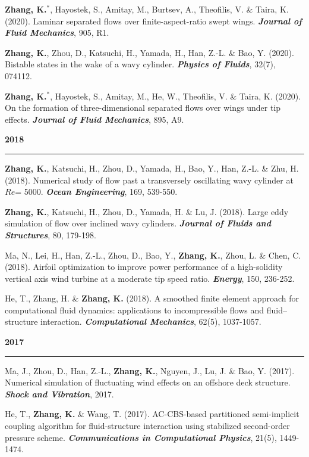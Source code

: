 \documentclass[10pt]{article}
\begin{document}
{\begin{etaremune}
  \item \textbf{Zhang, K.}$^*$, Hayostek, S., Amitay, M., Burtsev, A., Theofilis, V. \& Taira, K. (2020). Laminar separated flows over finite-aspect-ratio swept wings. \textit{\textbf{Journal of Fluid Mechanics}}, 905, R1.
  
  \item \textbf{Zhang, K.}, Zhou, D., Katsuchi, H., Yamada, H., Han, Z.-L. \& Bao, Y. (2020). Bistable states in the wake of a wavy cylinder. \textit{\textbf{Physics of Fluids}}, 32(7), 074112.
  
  \item \textbf{Zhang, K.}$^*$, Hayostek, S., Amitay, M., He, W., Theofilis, V. \& Taira, K. (2020). On the formation of three-dimensional separated flows over wings under tip effects. \textit{\textbf{Journal of Fluid Mechanics}}, 895, A9.

 \item [] {\bf \color{Blue} 2018 \rule{14.8cm}{0.2mm}} 

  \item \textbf{Zhang, K.}, Katsuchi, H., Zhou, D., Yamada, H., Bao, Y., Han, Z.-L. \& Zhu, H. (2018). Numerical study of flow past a transversely oscillating wavy cylinder at $Re$= 5000. \textit{\textbf{Ocean Engineering}}, 169, 539-550.
  
  \item \textbf{Zhang, K.}, Katsuchi, H., Zhou, D., Yamada, H. \& Lu, J. (2018). Large eddy simulation of flow over inclined wavy cylinders. \textit{\textbf{Journal of Fluids and Structures}}, 80, 179-198.
  
  \item Ma, N., Lei, H., Han, Z.-L., Zhou, D., Bao, Y., \textbf{Zhang, K.}, Zhou, L. \& Chen, C. (2018). Airfoil optimization to improve power performance of a high-solidity vertical axis wind turbine at a moderate tip speed ratio. \textit{\textbf{Energy}}, 150, 236-252.
  
  \item He, T., Zhang, H. \& \textbf{Zhang, K.} (2018). A smoothed finite element approach for computational fluid dynamics: applications to incompressible flows and fluid–structure interaction. \textit{\textbf{Computational Mechanics}}, 62(5), 1037-1057.

 \item [] {\bf \color{Blue} 2017 \rule{14.8cm}{0.2mm}}   

  \item Ma, J., Zhou, D., Han, Z.-L., \textbf{Zhang, K.}, Nguyen, J., Lu, J. \& Bao, Y. (2017). Numerical simulation of fluctuating wind effects on an offshore deck structure. \textit{\textbf{Shock and Vibration}}, 2017.
  \item He, T., \textbf{Zhang, K.} \& Wang, T. (2017). AC-CBS-based partitioned semi-implicit coupling algorithm for fluid-structure interaction using stabilized second-order pressure scheme. \textit{\textbf{Communications in Computational Physics}}, 21(5), 1449-1474.
  

\end{etaremune}}
\end{document}
